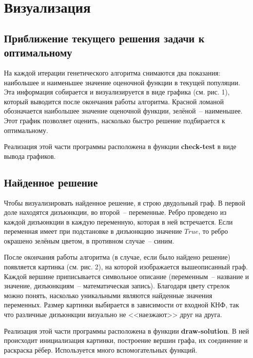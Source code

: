 \documentclass[12pt]{article}
\begin{document}
\pagebreak

	\section{Визуализация}

        \subsection{Приближение текущего решения задачи к оптимальному}
        На каждой итерации генетического алгоритма снимаются два показания: наибольшее и наименьшее значение оценочной функции в текущей популяции. Эта информация собирается и 
        визуализируется в виде графика (см. рис. 1), который выводится после окончания работы алгоритма. Красной ломаной обозначается наибольшее значение оценочной функции, зелёной~-- наименьшее.
        Этот график позволяет оценить, насколько быстро решение подбирается к оптимальному. 

        Реализация этой части программы расположена в функции \textbf{check-test} в виде вывода графиков.

        \subsection{Найденное решение}
        Чтобы визуализировать найденное решение, я строю двудольный граф. В первой доле находятся дизъюнкции, во второй~-- переменные. Ребро проведено из каждой дизъюнкции
        в каждую переменную, которая в ней встречается. Если переменная имеет при подстановке в дизъюнкцию значение $True$, то ребро окрашено зелёным цветом, в противном случае~--
        синим. 

        После окончания работы алгоритма (в случае, если было найдено решение) появляется картинка (см. рис. 2), на которой изображается вышеописанный граф. Каждой вершине приписывается
        символьное описание (переменным~-- название и значение, дизъюнкциям~-- математическая запись). Благодаря цвету стрелок можно понять, насколько уникальными являются найденные
        значения переменных. Размер картинки выбирается в зависимости от входной КНФ, так что различные дизъюнкции визуально не <<наезжают>> друг на друга.

        Реализация этой части программы расположена в функции \textbf{draw-solution}. В ней происходит инициализация картинки, построение вершин графа, их соединение и раскраска
        рёбер. Используется много вспомогательных функций.
\end{document}

